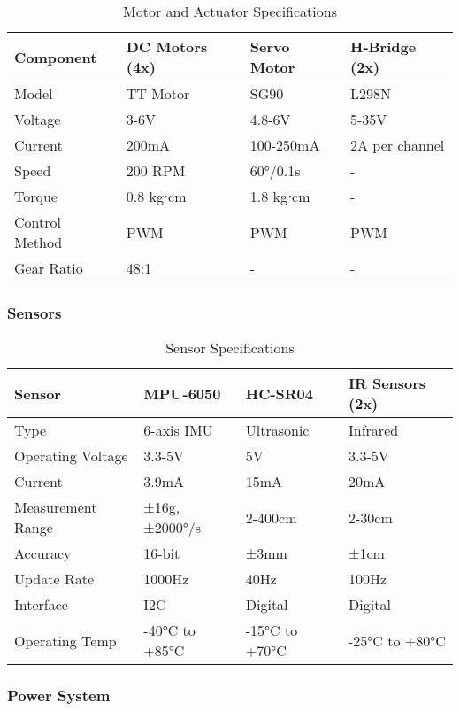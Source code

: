 \begin{table}[H]
\centering
\caption{Motor and Actuator Specifications}
\begin{tabular}{|l|l|l|l|}
\hline
\textbf{Component} & \textbf{DC Motors (4x)} & \textbf{Servo Motor} & \textbf{H-Bridge (2x)} \\
\hline
Model & TT Motor & SG90 & L298N \\
Voltage & 3-6V & 4.8-6V & 5-35V \\
Current & 200mA & 100-250mA & 2A per channel \\
Speed & 200 RPM & 60°/0.1s & - \\
Torque & 0.8 kg⋅cm & 1.8 kg⋅cm & - \\
Control Method & PWM & PWM & PWM \\
Gear Ratio & 48:1 & - & - \\
\hline
\end{tabular}
\label{tab:motors}
\end{table}

\subsubsection{Sensors}

\begin{table}[H]
\centering
\caption{Sensor Specifications}
\begin{tabular}{|l|l|l|l|}
\hline
\textbf{Sensor} & \textbf{MPU-6050} & \textbf{HC-SR04} & \textbf{IR Sensors (2x)} \\
\hline
Type & 6-axis IMU & Ultrasonic & Infrared \\
Operating Voltage & 3.3-5V & 5V & 3.3-5V \\
Current & 3.9mA & 15mA & 20mA \\
Measurement Range & ±16g, ±2000°/s & 2-400cm & 2-30cm \\
Accuracy & 16-bit & ±3mm & ±1cm \\
Update Rate & 1000Hz & 40Hz & 100Hz \\
Interface & I2C & Digital & Digital \\
Operating Temp & -40°C to +85°C & -15°C to +70°C & -25°C to +80°C \\
\hline
\end{tabular}
\label{tab:sensors}
\end{table}

\subsubsection{Power System}

